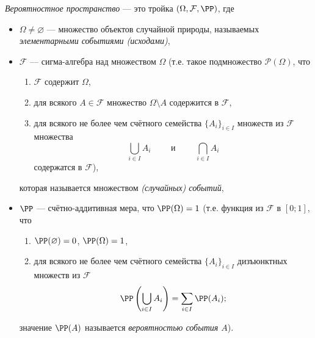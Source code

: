\documentclass[12pt,a4paper]{article}
\begin{document}
    \begin{definition}
        \emph{Вероятностное пространство} --- это тройка $(\Omega, \mathcal{F}, \PP)$, где
        \begin{itemize}
            \item $\Omega \neq \varnothing$ --- множество объектов случайной природы, называемых \emph{элементарными событиями (исходами)},
            \item $\mathcal{F}$ --- сигма-алгебра над множеством $\Omega$ (т.е. такое подмножество $\mathcal{P}(\Omega)$, что
                \begin{enumerate}
                    \item $\mathcal{F}$ содержит $\Omega$,
                    \item для всякого $A \in \mathcal{F}$ множество $\Omega \setminus A$ содержится в $\mathcal{F}$,
                    \item для всякого не более чем счётного семейства $\{A_i\}_{i \in I}$ множеств из $\mathcal{F}$ множества
                        \[
                            \bigcup_{i \in I} A_i
                            \qquad \text{ и } \qquad
                            \bigcap_{i \in I} A_i
                        \]
                        содержатся в $\mathcal{F}$),
                \end{enumerate}
                которая называется множеством \emph{(случайных) событий},
            \item $\PP$ --- счётно-аддитивная мера, что $\PP(\Omega) = 1$ (т.е. функция из $\mathcal{F}$ в $[0; 1]$, что
                \begin{enumerate}
                    \item $\PP(\varnothing) = 0$, $\PP(\Omega) = 1$,
                    \item для всякого не более чем счётного семейства $\{A_i\}_{i \in I}$ дизъюнктных множеств из $\mathcal{F}$
                        \[\PP\left(\bigcup_{i \in I} A_i\right) = \sum_{i \in I} \PP(A_i);\]
                \end{enumerate}
                значение $\PP(A)$ называется \emph{вероятностью события $A$}).
        \end{itemize}
    \end{definition}
\end{document}
